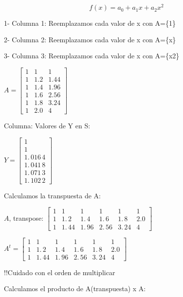 \documentclass{article}
\begin{document}
\[
f(x)=a_{0}+a_{1}x+a_{2}x^{2}
\]

1- Columna 1: Reemplazamos cada valor de x con A=\{1\}

2- Columna 2: Reemplazamos cada valor de x con A=\{x\}

3- Columna 3: Reemplazamos cada valor de x con A=\{x2\}

$A=\left[ 
\begin{array}{ccc}
1 & 1 & 1 \\ 
1 & 1.2 & 1.44 \\ 
1 & 1.4 & 1.96 \\ 
1 & 1.6 & 2.56 \\ 
1 & 1.8 & 3.24 \\ 
1 & 2.0 & 4%
\end{array}%
\right] $

\bigskip Columna: Valores de Y en S:

$Y=\left[ 
\begin{array}{c}
1 \\ 
1 \\ 
1.\,\allowbreak 016\,4 \\ 
1.\,\allowbreak 041\,8 \\ 
1.\,\allowbreak 071\,3 \\ 
1.\,\allowbreak 102\,2%
\end{array}%
\right] $

\bigskip 

Calculamos la transpuesta de A:

$A$, transpose: $\left[ 
\begin{array}{cccccc}
1 & 1 & 1 & 1 & 1 & 1 \\ 
1 & 1.\,\allowbreak 2 & 1.\,\allowbreak 4 & 1.\,\allowbreak 6 & 
1.\,\allowbreak 8 & 2.0 \\ 
1 & 1.\,\allowbreak 44 & 1.\,\allowbreak 96 & 2.\,\allowbreak 56 & 
3.\,\allowbreak 24 & 4%
\end{array}%
\right] \allowbreak $

$A^{t}=\left[ 
\begin{array}{cccccc}
1 & 1 & 1 & 1 & 1 & 1 \\ 
1 & 1.\,\allowbreak 2 & 1.\,\allowbreak 4 & 1.\,\allowbreak 6 & 
1.\,\allowbreak 8 & 2.0 \\ 
1 & 1.\,\allowbreak 44 & 1.\,\allowbreak 96 & 2.\,\allowbreak 56 & 
3.\,\allowbreak 24 & 4%
\end{array}%
\right] $

!!Cuidado con el orden de multiplicar

Calculamos el producto de A(transpuesta) x A:
\end{document}
